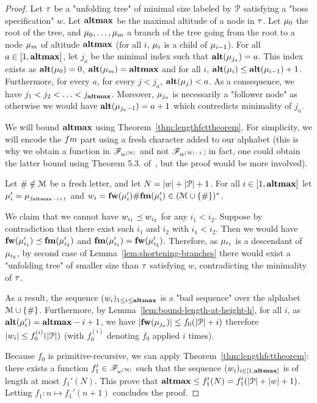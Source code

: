 \begin{proof}
	Let $\tau$ be a "unfolding tree" of minimal size labeled by $\mathcal{P}$ satisfying a "boss specification" $w$. Let $\mathbf{altmax}$ be the maximal altitude of a node in $\tau$. Let $\mu_0$ the root of the tree, and  $\mu_0, \ldots, \mu_m$ a branch of the tree going from the root to a node $\mu_m$ of altitude $\mathbf{altmax}$ (for all $i$, $\mu_i$ is a child of $\mu_{i-1}$).
	For all $a \in [1,\mathbf{altmax}]$, let $j_a$ be the minimal index such that $\mathbf{alt}(\mu_{j_a}) = a$. This index exists as $\mathbf{alt}(\mu_0) = 0$, $\mathbf{alt}(\mu_m) = \mathbf{altmax}$ and for all $i$, $\mathbf{alt}(\mu_{i}) \leq \mathbf{alt}(\mu_{i-1})+1$.
	Furthermore, for every $a$, for every $j < j_a$, $\mathbf{alt}(\mu_j) < a$. 
	As a consequence, we have $j_1 < j_2 < \ldots < j_{\mathbf{altmax}}$. Moreover, $\mu_{j_a}$ is necessarily a "follower node" as otherwise we would have $\mathbf{alt}(\mu_{j_a-1}) = a+1$ which contredicts minimality of $j_a$.
	
	We will bound $\mathbf{altmax}$ using Theorem~\ref{thm:lengthfcttheorem}. For simplicity, we will encode the $\followmessagespec$ part using a fresh character added to our alphabet (this is why we obtain a function in $\mathscr{F}_{w^{|\mathcal{M}|}}$ and not $\mathscr{F}_{w^{|\mathcal{M}|-1}}$; in fact, one could obtain the latter bound using Theorem 5.3. of~\cite{SchmitzS2011upperHigman}, but the proof would be more involved).

	Let $\# \notin \mathcal{M}$ be a fresh letter, and let $N = |w| + |\mathcal{P}|+1$. For all $i \in [1,\mathbf{altmax}]$ let $\mu'_i = \mu_{j_{\mathbf{altmax} - i+1}}$ and $w_i = \mathbf{fw}(\mu'_{i}) \# \mathbf{fm}(\mu'_{i}) \in (\mathcal{M} \cup \{\#\})^*$.
	
	We claim that we cannot have $w_{i_1}\preceq w_{i_2}$ for any  $i_1< i_2$.
	Suppose by contradiction that there exist such $i_1$ and $i_2$ with $i_1 < i_2$. Then we would have $\mathbf{fw}(\mu'_{i_1}) \preceq \mathbf{fm}(\mu'_{i_2})$ and $\mathbf{fm}(\mu'_{i_1}) = \mathbf{fw}(\mu'_{i_2})$.
	Therefore, as $\mu_{i_1}$ is a descendant of $\mu_{i_2}$, by second case of Lemma~\ref{lem:shortening-branches} there would exist a "unfolding tree" of smaller size than $\tau$ satisfying $w$, contradicting the minimality of $\tau$.
	
	As a result, the sequence $(w_i)_{1\leq i \leq \mathbf{altmax}}$ is a "bad sequence" over the alphabet $\mathcal{M}\cup\{\#\}$.
	Furthermore, by Lemma~\ref{lem:bound-length-at-height-h}, for all $i$, as $\mathbf{alt}(\mu'_{i}) = \mathbf{altmax}-i+1$, we have $|\mathbf{fw}(\mu_{j_a})| \leq f_0(|\mathcal{P}| + i)$ therefore $|w_i| \leq f_0^{(i)}(|\mathcal{P}|)$ (with $f_0^{(i)}$ denoting $f_0$ applied $i$ times).
	
	Because $f_0$ is primitive-recursive, we can apply Theorem~\ref{thm:lengthfcttheorem}: there exists a function $f_1' \in \mathscr{F}_{\omega^{|\mathcal{M}|}}$ such that the sequence $(w_i)_{i \in [1,\mathbf{altmax}]}$ is of length at most $f_1'(N)$. This prove that $\mathbf{altmax} \leq f_1'(N) = f_1'(|\mathcal{P}| + |w| + 1)$. Letting $f_1 :n \mapsto f_1'(n+1)$ concludes the proof.
\end{proof}


